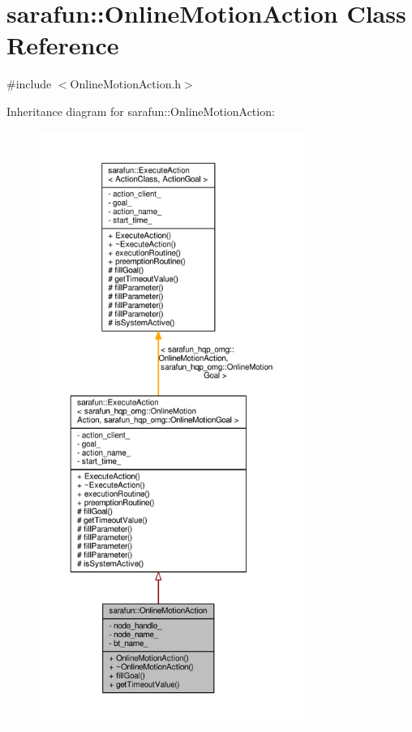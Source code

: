 \hypertarget{classsarafun_1_1OnlineMotionAction}{\section{sarafun\-:\-:Online\-Motion\-Action Class Reference}
\label{classsarafun_1_1OnlineMotionAction}
}


{\ttfamily \#include $<$Online\-Motion\-Action.\-h$>$}



Inheritance diagram for sarafun\-:\-:Online\-Motion\-Action\-:\nopagebreak
\begin{figure}[H]
\begin{center}
\leavevmode
\includegraphics[height=550pt]{da/d89/classsarafun_1_1OnlineMotionAction__inherit__graph}
\end{center}
\end{figure}


